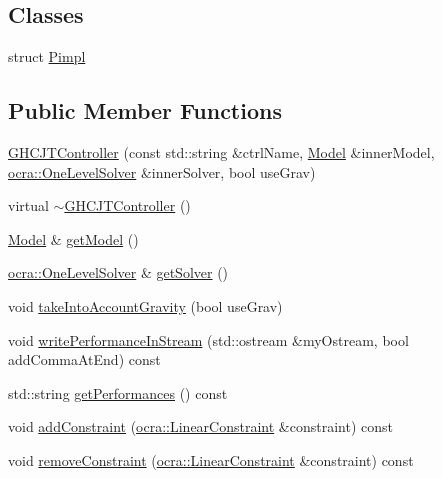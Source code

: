 \subsection*{Classes}
\begin{DoxyCompactItemize}
\item 
struct \hyperlink{structgocra_1_1GHCJTController_1_1Pimpl}{Pimpl}
\end{DoxyCompactItemize}
\subsection*{Public Member Functions}
\begin{DoxyCompactItemize}
\item 
\hyperlink{classgocra_1_1GHCJTController_a0a9898a818ddf6e52da7d63616bd73f6}{G\+H\+C\+J\+T\+Controller} (const std\+::string \&ctrl\+Name, \hyperlink{classocra_1_1Model}{Model} \&inner\+Model, \hyperlink{classocra_1_1OneLevelSolver}{ocra\+::\+One\+Level\+Solver} \&inner\+Solver, bool use\+Grav)
\item 
virtual \hyperlink{classgocra_1_1GHCJTController_ab20678c55e42d6f844b11e044f258e4b}{$\sim$\+G\+H\+C\+J\+T\+Controller} ()
\item 
\hyperlink{classocra_1_1Model}{Model} \& \hyperlink{classgocra_1_1GHCJTController_ac687ebab107bcd79828564b0adad2e10}{get\+Model} ()
\item 
\hyperlink{classocra_1_1OneLevelSolver}{ocra\+::\+One\+Level\+Solver} \& \hyperlink{classgocra_1_1GHCJTController_a25b8ce2edaa3fccc38dfa81900353856}{get\+Solver} ()
\item 
void \hyperlink{classgocra_1_1GHCJTController_a755394cc7a6c038f517583faa47e7f62}{take\+Into\+Account\+Gravity} (bool use\+Grav)
\item 
void \hyperlink{classgocra_1_1GHCJTController_a71c44a633f39e843d97fc7f97dddfce4}{write\+Performance\+In\+Stream} (std\+::ostream \&my\+Ostream, bool add\+Comma\+At\+End) const
\item 
std\+::string \hyperlink{classgocra_1_1GHCJTController_add50119553cb0f5de3f5639523968939}{get\+Performances} () const
\item 
void \hyperlink{classgocra_1_1GHCJTController_a04da6a1642a2f6e79c2a6cf375ff703c}{add\+Constraint} (\hyperlink{namespaceocra_ae8b87cf4099be3efc3b410019ad2046e}{ocra\+::\+Linear\+Constraint} \&constraint) const
\item 
void \hyperlink{classgocra_1_1GHCJTController_a1ca094d27af8fe35e4196647eb5aeb4e}{remove\+Constraint} (\hyperlink{namespaceocra_ae8b87cf4099be3efc3b410019ad2046e}{ocra\+::\+Linear\+Constraint} \&constraint) const

\end{DoxyCompactItemize}
